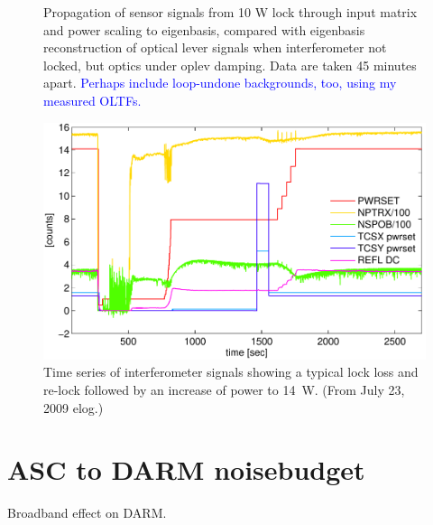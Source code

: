 \begin{figure}
\begin{centering}
\caption[Angular motion suppression due to the ASC]{Propagation of
  sensor signals from 10 W lock through input matrix and power scaling
  to eigenbasis, compared with eigenbasis reconstruction of optical
  lever signals when interferometer not locked, but optics under oplev
  damping. Data are taken 45 minutes apart. \textcolor{blue}{Perhaps
    include loop-undone backgrounds, too, using my measured OLTFs.}}
\label{fig:}
\end{centering}
\end{figure}




\begin{figure}
\begin{centering}
\includegraphics[width=1.0\columnwidth]{figures/timeseries_ifolocked.pdf}
\caption[Striptool example]{Time series of interferometer signals
  showing a typical lock loss and re-lock followed by an increase of
  power to 14~W. (From July 23, 2009 elog.)}
\label{fig:striptool}
\end{centering}
\end{figure}




\section{ASC to DARM noisebudget}
Broadband effect on DARM.

